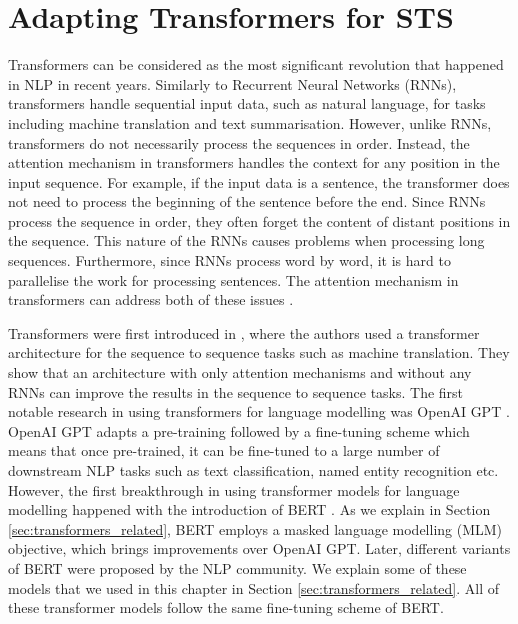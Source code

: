 \chapter{\label{cha:sts_transformers}Adapting Transformers for STS}

Transformers can be considered as the most significant revolution that happened in NLP in recent years. Similarly to Recurrent Neural Networks (RNNs), transformers handle sequential input data, such as natural language, for tasks including machine translation and text summarisation. However, unlike RNNs, transformers do not necessarily process the sequences in order. Instead, the attention mechanism in transformers handles the context for any position in the input sequence. For example, if the input data is a sentence, the transformer does not need to process the beginning of the sentence before the end. Since RNNs process the sequence in order, they often forget the content of distant positions in the sequence. This nature of the RNNs causes problems when processing long sequences. Furthermore, since RNNs process word by word, it is hard to parallelise the work for processing sentences. The attention mechanism in transformers can address both of these issues \autocite{10.5555/3295222.3295349}.


Transformers were first introduced in \textcite{10.5555/3295222.3295349}, where the authors used a transformer architecture for the sequence to sequence tasks such as machine translation. They show that an architecture with only attention mechanisms and without any RNNs can improve the results in the sequence to sequence tasks. The first notable research in using transformers for language modelling was OpenAI GPT \autocite{radford2018improving}. OpenAI GPT adapts a pre-training followed by a fine-tuning scheme which means that once pre-trained, it can be fine-tuned to a large number of downstream NLP tasks such as text classification, named entity recognition etc. However, the first breakthrough in using transformer models for language modelling happened with the introduction of BERT \autocite{devlin-etal-2019-bert}. As we explain in Section \ref{sec:transformers_related}, BERT employs a masked language modelling (MLM) objective, which brings improvements over OpenAI GPT. Later, different variants of BERT were proposed by the NLP community. We explain some of these models that we used in this chapter in Section \ref{sec:transformers_related}. All of these transformer models follow the same fine-tuning scheme of BERT.


